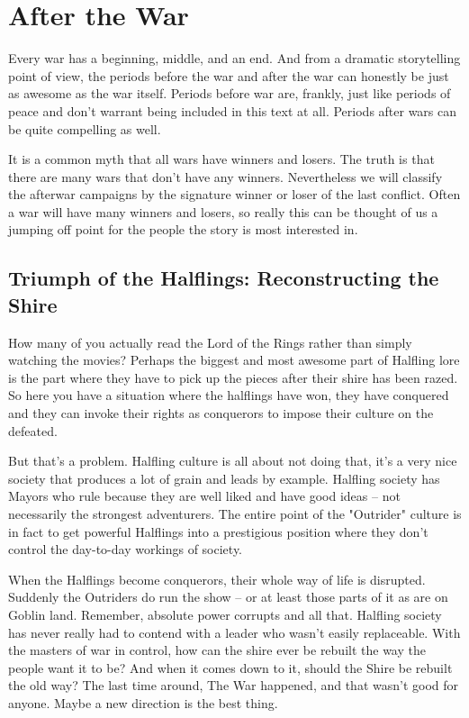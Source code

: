 \section{After the War}
\vspace*{-10pt}

Every war has a beginning, middle, and an end. And from a dramatic storytelling point of view, the periods before the war and after the war can honestly be just as awesome as the war itself. Periods before war are, frankly, just like periods of peace and don't warrant being included in this text at all. Periods after wars can be quite compelling as well.

It is a common myth that all wars have winners and losers. The truth is that there are many wars that don't have any winners. Nevertheless we will classify the afterwar campaigns by the signature winner or loser of the last conflict. Often a war will have many winners and losers, so really this can be thought of us a jumping off point for the people the story is most interested in.

\subsection{Triumph of the Halflings: Reconstructing the Shire}

How many of you actually read the Lord of the Rings rather than simply watching the movies? Perhaps the biggest and most awesome part of Halfling lore is the part where they have to pick up the pieces after their shire has been razed. So here you have a situation where the halflings have won, they have conquered and they can invoke their rights as conquerors to impose their culture on the defeated.

But that's a problem. Halfling culture is all about not doing that, it's a very nice society that produces a lot of grain and leads by example. Halfling society has Mayors who rule because they are well liked and have good ideas -- not necessarily the strongest adventurers. The entire point of the "Outrider" culture is in fact to get powerful Halflings into a prestigious position where they don't control the day-to-day workings of society.

When the Halflings become conquerors, their whole way of life is disrupted. Suddenly the Outriders do run the show -- or at least those parts of it as are on Goblin land. Remember, absolute power corrupts and all that. Halfling society has never really had to contend with a leader who wasn't easily replaceable. With the masters of war in control, how can the shire ever be rebuilt the way the people want it to be? And when it comes down to it, should the Shire be rebuilt the old way? The last time around, The War happened, and that wasn't good for anyone. Maybe a new direction is the best thing.

